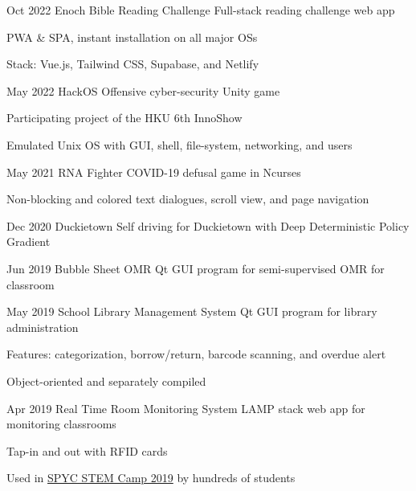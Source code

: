 \projectEntry
{Oct 2022}
{Enoch Bible Reading Challenge}
{Full-stack reading challenge web app}
{
\begin{descitemize}
	\item PWA \& SPA, instant installation on all major OSs
    \item Stack: Vue.js, Tailwind CSS, Supabase, and Netlify
\end{descitemize}
}

\hypertarget{HackOS}{
\projectEntry
{May 2022}
{HackOS}
{Offensive cyber-security Unity game}
{
\begin{descitemize}
    \specialitem Participating project of the HKU 6th InnoShow
    \item Emulated Unix OS with GUI, shell, file-system, networking, and users
\end{descitemize}
}
}

\projectEntry
{May 2021}
{RNA Fighter}
{COVID-19 defusal game in Ncurses}
{
\begin{descitemize}
	\item Non-blocking and colored text dialogues, scroll view, and page navigation
\end{descitemize}
}

\projectEntry
{Dec 2020}
{Duckietown}
{Self driving for Duckietown with Deep Deterministic Policy Gradient}
{}

\projectEntry
{Jun 2019}
{Bubble Sheet OMR}
{Qt GUI program for semi-supervised OMR for classroom}
{}

\projectEntry
{May 2019}
{School Library Management System}
{Qt GUI program for library administration}
{
\begin{descitemize}
    \item Features: categorization, borrow/return,  barcode scanning, and overdue alert
    \item Object-oriented and separately compiled
\end{descitemize}
}

\hypertarget{RTRMS}{
\projectEntry
{Apr 2019}
{Real Time Room Monitoring System}
{LAMP stack web app for monitoring classrooms}
{
\begin{descitemize}
    \item Tap-in and out with RFID cards
    \item Used in \hyperlink{STEM_Camp_2019}{SPYC STEM Camp 2019} by hundreds of students
\end{descitemize}
}
}


